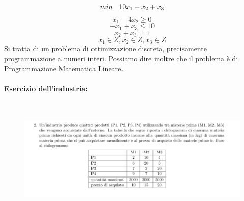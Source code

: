 \vspace{0.2cm}

\begin{equation*}
min \hspace{0.3cm} 10x_1 + x_2 + x_3 
\end{equation*}
\begin{equation*}
    x_1 - 4x_2 \geq 0
\end{equation*}
\begin{equation*}
    -x_1 + x_3 \leq 10
\end{equation*}
\begin{equation*}
    x_2 + x_3 = 1 
\end{equation*}
\begin{equation*}
    x_1 \in Z, x_2 \in Z, x_3 \in Z
\end{equation*}
Si tratta di un problema di ottimizzazione discreta, precisamente programmazione a numeri interi. Possiamo dire inoltre che il problema è di Programmazione Matematica Lineare.


\paragraph{Esercizio dell'industria:} 

\

\begin{figure}[h!]
    \centering
    \includegraphics[scale=0.8]{autovalutazioneesercizio1.png}
\end{figure}

